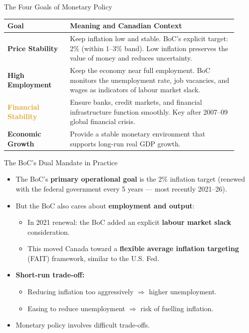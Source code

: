 \documentclass[aspectratio=169]{beamer}
\begin{document}
\begin{frame}{The Four Goals of Monetary Policy}
\transfade
\begin{center}
\begin{tabular}{p{0.25\linewidth} p{0.67\linewidth}}
\toprule
\textbf{Goal} & \textbf{Meaning and Canadian Context} \\
\midrule
\textcolor{accent}{\textbf{Price Stability}} & Keep inflation low and stable. BoC's explicit target: \alert{2\%} (within 1--3\% band). Low inflation preserves the value of money and reduces uncertainty. \\
\addlinespace
\textcolor{leafgreen}{\textbf{High Employment}} & Keep the economy near full employment. BoC monitors the unemployment rate, job vacancies, and wages as indicators of labour market slack. \\
\addlinespace
\textcolor{goldenrod}{\textbf{Financial Stability}} & Ensure banks, credit markets, and financial infrastructure function smoothly. Key after 2007--09 global financial crisis. \\
\addlinespace
\textcolor{deeporange}{\textbf{Economic Growth}} & Provide a stable monetary environment that supports long-run real GDP growth. \\
\bottomrule
\end{tabular}
\end{center}
\end{frame}

\begin{frame}{The BoC's Dual Mandate in Practice}
\transfade
\begin{itemize}
  \item The BoC's \textbf{primary operational goal} is the 2\% inflation target (renewed with the federal government every 5 years --- most recently 2021--26).
  \item But the BoC also cares about \textbf{employment and output}:
  \begin{itemize}
    \item In 2021 renewal: the BoC added an explicit \textbf{labour market slack} consideration.
    \item This moved Canada toward a \textbf{flexible average inflation targeting} (FAIT) framework, similar to the U.S. Fed.
  \end{itemize}
  \item \textbf{Short-run trade-off:}
  \begin{itemize}
    \item Reducing inflation too aggressively $\Rightarrow$ higher unemployment.
    \item Easing to reduce unemployment $\Rightarrow$ risk of fuelling inflation.
  \end{itemize}
  \item Monetary policy involves \alert{difficult trade-offs}.
\end{itemize}
\end{frame}
\end{document}
